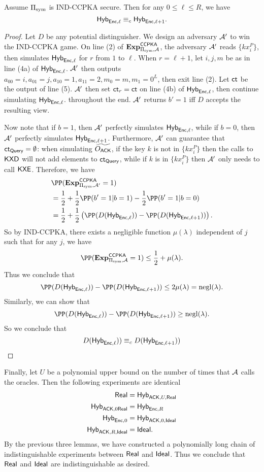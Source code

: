\begin{lemma}
    Assume $\Pi_{\text{sym}}$ is IND-CCPKA secure. Then for any $0 \leq \ell \leq R$, we have
    $$\mathsf{Hyb}_{\mathsf{Enc}, \ell} \equiv_c \mathsf{Hyb}_{\mathsf{Enc}, \ell + 1}.$$
\end{lemma}
\begin{proof}
    Let $D$ be any potential distinguisher. We design an adversary $\mathcal{A}'$ to win the IND-CCPKA game. On line (2) of $\mathbf{Exp}^{\mathsf{CCPKA}}_{\Pi_{\text{sym}}, \mathcal{A}}$, the adversary $\mathcal{A}'$ reads $\{kx_i^P\}$, then simulates $\mathsf{Hyb}_{\mathsf{Enc}, \ell}$ for $r$ from $1$ to $\ell$. When $r = \ell + 1$, let $i, j, m$ be as in line (4a) of $\mathsf{Hyb}_{\mathsf{Enc}, \ell}$. $\mathcal{A}'$ then outputs $a_{00} = i, a_{01} = j, a_{10} = 1, a_{11} = 2, m_0 = m, m_1 = 0^L$, then exit line (2). Let $\mathsf{ct}$ be the output of line (5). $\mathcal{A}'$ then set $\mathsf{ct}_r = \mathsf{ct}$ on line (4b) of $\mathsf{Hyb}_{\mathsf{Enc}, \ell}$, then continue simulating $\mathsf{Hyb}_{\mathsf{Enc}, \ell}$. throughout the end. $\mathcal{A}'$ returns $b' = 1$ iff $D$ accepts the resulting view.

     Now note that if $b = 1$, then $\mathcal{A}'$ perfectly simulates $\mathsf{Hyb}_{\mathsf{Enc}, \ell}$, while if $b = 0$, then $\mathcal{A}'$ perfectly simulates $\mathsf{Hyb}_{\mathsf{Enc}, \ell+1}$. Furthermore, $\mathcal{A}'$ can guarantee that $\mathsf{ct}_{\mathsf{Query}} = \emptyset$: when simulating $\widetilde{O_{\mathsf{ACK}}}$, if the key $k$ is not in $\{kx_i^P\}$ then the calls to $\mathsf{KXD}$ will not add elements to $\mathsf{ct}_{\mathsf{Query}}$, while if $k$ is in $\{kx_i^P\}$ then $\mathcal{A}'$ only needs to call $\mathsf{KXE}$. Therefore, we have
    \begin{align*}
     &\PP(\mathbf{Exp}^{\mathsf{CCPKA}}_{\Pi_{\sym}, \cA'} = 1) \\
     &= \frac{1}{2} + \frac{1}{2}\PP(b' = 1 | b = 1) - \frac{1}{2}\PP(b' = 1 | b = 0) \\   
     &= \frac{1}{2} + \frac{1}{2}\left(\PP(D(\Hyb_{\enc, \ell})) - \PP(D(\Hyb_{\enc, \ell+1}))\right).
    \end{align*}
    So by IND-CCPKA, there exists a negligible function $\mu(\lambda)$ independent of $j$ such that for any $j$, we have
    $$\PP(\mathbf{Exp}^{\mathsf{CCPKA}}_{\Pi_{\sym}, \cA} = 1) \leq \frac{1}{2} + \mu(\lambda).$$
    Thus we conclude that
    $$\PP(D(\Hyb_{\enc, \ell})) - \PP(D(\Hyb_{\enc, \ell+1})) \leq 2\mu(\lambda) = \negl(\lambda).$$
    Similarly, we can show that
    $$\PP(D(\Hyb_{\enc, \ell})) - \PP(D(\Hyb_{\enc, \ell+1})) \geq \negl(\lambda).$$
    So we conclude that
    $$D(\mathsf{Hyb}_{\mathsf{Enc}, \ell})) \equiv_c D(\mathsf{Hyb}_{\mathsf{Enc}, \ell + 1}))$$
\end{proof}
Finally, let $U$ be a polynomial upper bound on the number of times that $\mathcal{A}$ calls the oracles. Then the following experiments are identical
\begin{align*}
\mathsf{Real} &= \mathsf{Hyb}_{\mathsf{ACK}, U, \mathsf{Real}} \\
\mathsf{Hyb}_{\mathsf{ACK}, 0 \mathsf{Real}} &= \mathsf{Hyb}_{\mathsf{Enc}, R} \\
\mathsf{Hyb}_{\mathsf{Enc}, 0} &= \mathsf{Hyb}_{\mathsf{ACK}, 0, \mathsf{Ideal}} \\
\mathsf{Hyb}_{\mathsf{ACK}, R, \mathsf{Ideal}} &= \mathsf{Ideal}.
\end{align*}
By the previous three lemmas, we have constructed a polynomially long chain of indistinguishable experiments between $\mathsf{Real}$ and $\mathsf{Ideal}$. Thus we conclude that $\mathsf{Real}$ and $\mathsf{Ideal}$ are indistinguishable as desired.
\clearpage